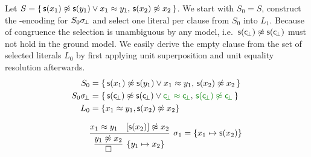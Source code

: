 \begin{example}\label{ex:nat:instgeneq}
	Let \( S = \{ \, \mathsf{s}(x_1) \not\approx \mathsf{s} (y_1) \lor x_1 \approx y_1, \, \mathsf{s}(x_2)\not\approx x_2 \, \} \).
	We start with \( S_0 = S \), construct the \SMT-encoding for \( S_0\sigma \!_\bot \)
	and select one literal per clause from \( S_0 \) into \( L_1 \).
	Because of congruence the selection is unambiguous by any model,
	i.e.~\(\mathsf{s}(\mathsf{c} \!_\bot) \not\approx \mathsf{s} (\mathsf{c} \!_\bot)\) must not hold in the ground model.
	We easily derive the empty clause from the set of selected literals \( L_0 \)
	by first applying unit superposition and unit equality resolution afterwards.
\begin{align*}
	S_0 &= \{ \, {\msucc(x_1) \mNE \msucc (y_1) \lor x_1 \mEQ y_1}, \, \msucc(x_2)\mNE x_2 \, \}
	\\
	S_0\subsbot &= \{ \, \msucc(\consbot) \mNE \msucc (\consbot) \lor{\colHi\consbot \mEQ \consbot}, \,
	{\colHi \msucc(\consbot)\mNE \consbot} \, \}
	\\
	L_0 &= \{ x_1\mEQ y_1, \msucc(x_2)\mNE x_2 \}
	\\[0.7em]
	&\infer[\sigma_1 = \{ x_1\mapsto \msucc(x_2)\}
	]{
		\infer[ \{ y_1\mapsto x_2\}]{\emptyclause}{ {y_1}\mNE x_2 }
	}
	{x_1 \mEQ y_1 & [{\msucc(x_2)}]\mNE x_2}
	\\[0.7em]
\end{align*}


\end{example}
